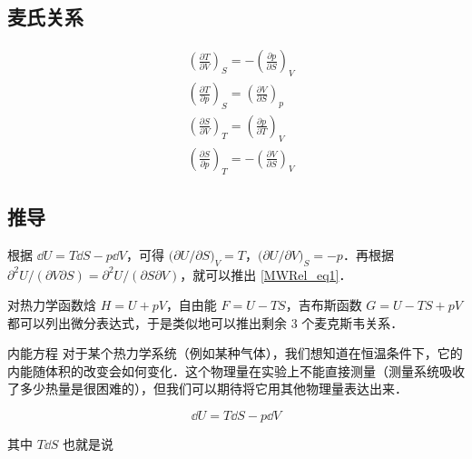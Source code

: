 

\subsection{麦氏关系}

\begin{align}
&\left(\frac{\partial T}{\partial V}\right)_S=-\left(\frac{\partial p}{\partial S}\right)_V\label{MWRel_eq1}
\\
&\left(\frac{\partial T}{\partial p}\right)_S=\left(\frac{\partial V}{\partial S}\right)_p
\\
&\left(\frac{\partial S}{\partial V}\right)_T=\left(\frac{\partial p}{\partial T}\right)_V
\\
&\left(\frac{\partial S}{\partial p}\right)_T=-\left(\frac{\partial V}{\partial S}\right)_V
\end{align}

\subsection{推导}
根据 $\dd U=T\dd S-p\dd V$，可得 $\Big(\partial U/\partial S\Big)_V=T$，$\Big(\partial U/\partial V\Big)_S=-p$．再根据 $\partial^2 U/(\partial V\partial S)=\partial^2 U/(\partial S\partial V)$，就可以推出 \autoref{MWRel_eq1}．

对热力学函数焓 $H=U+pV$，自由能 $F=U-TS$，吉布斯函数 $G=U-TS+pV$ 都可以列出微分表达式，于是类似地可以推出剩余 $3$ 个麦克斯韦关系．

\begin{example}{内能方程}
对于某个热力学系统（例如某种气体），我们想知道在恒温条件下，它的内能随体积的改变会如何变化．这个物理量在实验上不能直接测量（测量系统吸收了多少热量是很困难的），但我们可以期待将它用其他物理量表达出来．

\begin{equation}
\dd U=T\dd S-p\dd V
\end{equation}

其中 $T\dd S$ 也就是说

\end{example}

